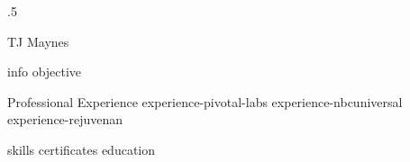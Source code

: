 \documentclass[10pt]{article}
\begin{document}
\moveleft.5\hoffset\centerline{\huge TJ Maynes}
{info}
{objective}
\begin{section}{Professional Experience}
  {experience-pivotal-labs}
  {experience-nbcuniversal}
  {experience-rejuvenan}
\end{section}
{skills}
{certificates}
{education}
\end{document}
